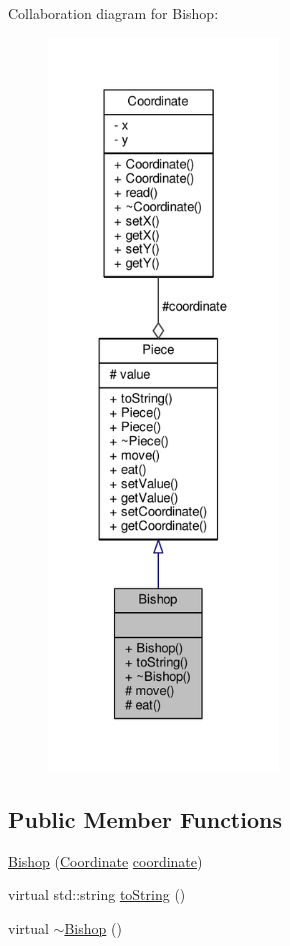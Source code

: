Collaboration diagram for Bishop\+:\nopagebreak
\begin{figure}[H]
\begin{center}
\leavevmode
\includegraphics[height=550pt]{class_bishop__coll__graph}
\end{center}
\end{figure}
\subsection*{Public Member Functions}
\begin{DoxyCompactItemize}
\item 
\hyperlink{class_bishop_abc54c861677423ac25f0c819cb9cbb55}{Bishop} (\hyperlink{class_coordinate}{Coordinate} \hyperlink{class_piece_a9e92373c8fffc1f5efb20d62204b70cf}{coordinate})
\item 
virtual std\+::string \hyperlink{class_bishop_af69ba4eec8bcf5dad66c8071a168bdba}{to\+String} ()
\item 
virtual \hyperlink{class_bishop_a3705b4537a39d09a59143fe01a62442f}{$\sim$\+Bishop} ()
\end{DoxyCompactItemize}
